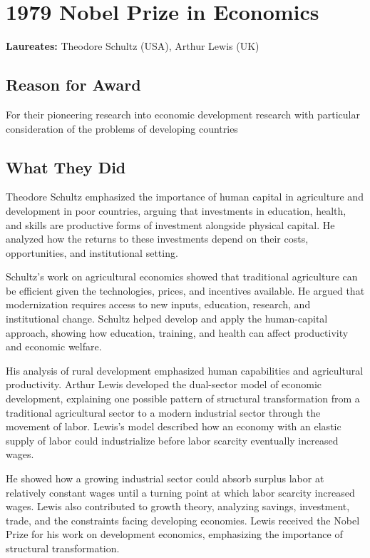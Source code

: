 \chapter{1979 Nobel Prize in Economics}
\textbf{Laureates: }Theodore Schultz (USA), Arthur Lewis (UK)

\section*{Reason for Award}
For their pioneering research into economic development research with particular consideration of
the problems of developing countries

\section{What They Did}
Theodore Schultz emphasized the importance of human capital in agriculture and development in poor
countries, arguing that investments in education, health, and skills are productive forms of
investment alongside physical capital. He analyzed how the returns to these investments depend on
their costs, opportunities, and institutional setting.

Schultz's work on agricultural economics showed that traditional agriculture can be efficient given
the technologies, prices, and incentives available. He argued that modernization requires access
to new inputs, education, research, and institutional change. Schultz helped develop and apply the
human-capital approach, showing how education, training, and health can affect productivity and
economic welfare.

His analysis of rural development emphasized human capabilities and agricultural productivity.
Arthur Lewis developed the dual-sector model of economic development, explaining one possible
pattern of structural transformation from a traditional agricultural sector to a modern industrial
sector through the movement of labor. Lewis's model described how an economy with an elastic supply
of labor could industrialize before labor scarcity eventually increased wages.

He showed how a growing industrial sector could absorb surplus labor at relatively constant wages
until a turning point at which labor scarcity increased wages. Lewis also contributed to growth
theory, analyzing savings, investment, trade, and the constraints facing developing economies.
Lewis received the Nobel Prize for his work on development economics, emphasizing the importance
of structural transformation.

